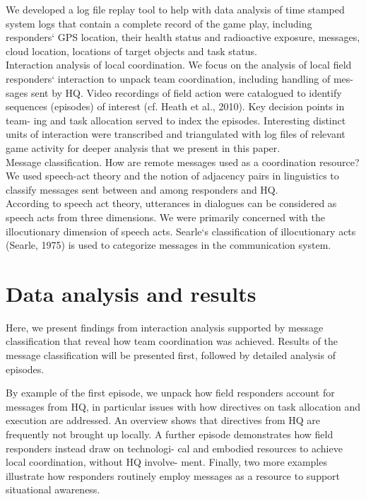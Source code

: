 We developed a log file replay tool to help with data analysis of time stamped system logs that contain a complete record of the game play, including responders` GPS location, their health status and radioactive exposure, messages, cloud location, locations of target objects and task status.\\

Interaction analysis of local coordination. We focus on the analysis of local field responders` interaction to unpack team coordination, including handling of mes- sages sent by HQ. Video recordings of field action were catalogued to identify sequences (episodes) of interest (cf. Heath et al., 2010). Key decision points in team- ing and task allocation served to index the episodes. Interesting distinct units of interaction were transcribed and triangulated with log files of relevant game activity for deeper analysis that we present in this paper.\\

Message classification. How are remote messages used as a coordination resource? We used speech-act theory and the notion of adjacency pairs in linguistics to classify messages sent between and among responders and HQ.\\

According to speech act theory, utterances in dialogues can be considered as speech acts from three dimensions. We were primarily concerned with the illocutionary dimension of speech acts. Searle`s classification of illocutionary acts (Searle, 1975) is used to categorize messages in the communication system.\\


\section{Data analysis and results}
Here, we present findings from interaction analysis supported by message classification that reveal how team coordination was achieved. Results of the message classification will be presented first, followed by detailed analysis of episodes. 

By example of the first episode, we unpack how field responders account for messages from HQ, in particular issues with how directives on task allocation and execution are addressed. An overview shows that directives from HQ are frequently not brought up locally. A further episode demonstrates how field responders instead draw on technologi- cal and embodied resources to achieve local coordination, without HQ involve- ment. Finally, two more examples illustrate how responders routinely employ messages as a resource to support situational awareness.\\

